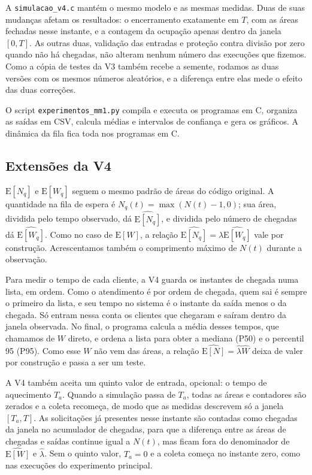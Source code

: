 \documentclass[
  article,      %
  10pt,         %
  oneside,
  a4paper,
  twocolumn,    %
  english,
  brazil        %
]{abntex2}
\newcommand{\EN}{\mathrm{E}[N]}
\newcommand{\EW}{\mathrm{E}[W]}
\newcommand{\ENq}{\mathrm{E}[N_q]}
\newcommand{\EWq}{\mathrm{E}[W_q]}
\begin{document}
A \texttt{simulacao\_v4.c} mantém o mesmo modelo e as mesmas medidas. Duas de suas mudanças afetam os resultados: o encerramento exatamente em $T$, com as áreas fechadas nesse instante, e a contagem da ocupação apenas dentro da janela $[0,T]$. As outras duas, validação das entradas e proteção contra divisão por zero quando não há chegadas, não alteram nenhum número das execuções que fizemos. Como a cópia de testes da V3 também recebe a semente, rodamos as duas versões com os mesmos números aleatórios, e a diferença entre elas mede o efeito das duas correções.

O script \texttt{experimentos\_mm1.py} compila e executa os programas em C, organiza as saídas em CSV, calcula médias e intervalos de confiança e gera os gráficos. A dinâmica da fila fica toda nos programas em C.

\subsection{Extensões da V4}
\label{sec:extensoes}

$\ENq$ e $\EWq$ seguem o mesmo padrão de áreas do código original. A quantidade na fila de espera é $N_q(t)=\max(N(t)-1,0)$; sua área, dividida pelo tempo observado, dá $\widehat{\ENq}$, e dividida pelo número de chegadas dá $\widehat{\EWq}$. Como no caso de $\EW$, a relação $\widehat{\ENq}=\widehat{\lambda}\widehat{\EWq}$ vale por construção. Acrescentamos também o comprimento máximo de $N(t)$ durante a observação.

Para medir o tempo de cada cliente, a V4 guarda os instantes de chegada numa lista, em ordem. Como o atendimento é por ordem de chegada, quem sai é sempre o primeiro da lista, e seu tempo no sistema é o instante da saída menos o da chegada. Só entram nessa conta os clientes que chegaram e saíram dentro da janela observada. No final, o programa calcula a média desses tempos, que chamamos de $W$ direto, e ordena a lista para obter a mediana (P50) e o percentil 95 (P95). Como esse $W$ não vem das áreas, a relação $\widehat{\EN}=\widehat{\lambda}\widehat{W}$ deixa de valer por construção e passa a ser um teste.

A V4 também aceita um quinto valor de entrada, opcional: o tempo de aquecimento $T_a$. Quando a simulação passa de $T_a$, todas as áreas e contadores são zerados e a coleta recomeça, de modo que as medidas descrevem só a janela $[T_a,T]$. As solicitações já presentes nesse instante são contadas como chegadas da janela no acumulador de chegadas, para que a diferença entre as áreas de chegadas e saídas continue igual a $N(t)$, mas ficam fora do denominador de $\widehat{\EW}$ e $\widehat{\lambda}$. Sem o quinto valor, $T_a=0$ e a coleta começa no instante zero, como nas execuções do experimento principal.
\end{document}
